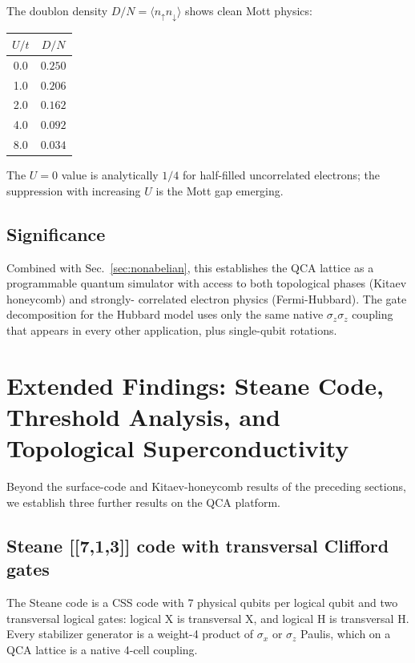 \documentclass[11pt,aps,prl,twocolumn]{revtex4-2}
\begin{document}
The doublon density $D/N = \langle n_\uparrow n_\downarrow\rangle$
shows clean Mott physics:
\begin{center}
\begin{tabular}{cc}
\hline
$U/t$ & $D/N$ \\
\hline
0.0 & $0.250$ \\
1.0 & $0.206$ \\
2.0 & $0.162$ \\
4.0 & $0.092$ \\
8.0 & $0.034$ \\
\hline
\end{tabular}
\end{center}
The $U = 0$ value is analytically $1/4$ for half-filled
uncorrelated electrons; the suppression with increasing $U$ is
the Mott gap emerging.

\subsection{Significance}

Combined with Sec.~\ref{sec:nonabelian}, this establishes the
QCA lattice as a programmable quantum simulator with access to
both topological phases (Kitaev honeycomb) and strongly-
correlated electron physics (Fermi-Hubbard).  The gate
decomposition for the Hubbard model uses only the same native
$\sigma_z \sigma_z$ coupling that appears in every other
application, plus single-qubit rotations.

\section{Extended Findings: Steane Code, Threshold Analysis, and Topological Superconductivity}
\label{sec:extended}

Beyond the surface-code and Kitaev-honeycomb results of the
preceding sections, we establish three further results on the
QCA platform.

\subsection{Steane [[7,1,3]] code with transversal Clifford gates}

The Steane code is a CSS code with 7 physical qubits per logical
qubit and two transversal logical gates: logical X is transversal
X, and logical H is transversal H.  Every stabilizer generator
is a weight-4 product of $\sigma_x$ or $\sigma_z$ Paulis, which
on a QCA lattice is a native 4-cell coupling.
\end{document}
